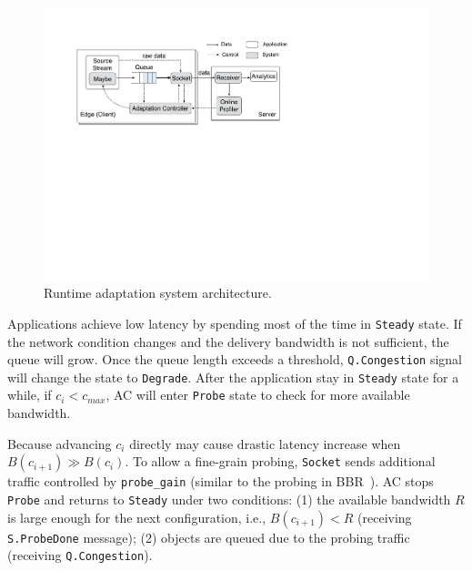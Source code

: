 \begin{figure}
  \centering
  \includegraphics[width=\linewidth]{figures/runtime-adaptation.pdf}
  \caption{Runtime adaptation system architecture.}
  \label{fig:runtime}
\end{figure}

 Applications achieve low latency by
spending most of the time in \texttt{Steady} state. If the network condition
changes and the delivery bandwidth is not sufficient, the queue will grow. Once
the queue length exceeds a threshold, \texttt{Q.Congestion} signal will change
the state to \texttt{Degrade}. After the application stay in \texttt{Steady}
state for a while, if $c_i < c_{max}$, AC will enter \texttt{Probe} state to
check for more available bandwidth.

 Because advancing $c_i$
directly may cause drastic latency increase when $B(c_{i+1}) \gg B(c_i)$. To
allow a fine-grain probing, \texttt{Socket} sends additional traffic controlled
by \texttt{probe\_gain} (similar to the probing in BBR~\cite{cardwell2017bbr}).
AC stops \texttt{Probe} and returns to \texttt{Steady} under two conditions: (1)
the available bandwidth $R$ is large enough for the next configuration, i.e.,
$B(c_{i+1}) < R$ (receiving \texttt{S.ProbeDone} message); (2) objects are
queued due to the probing traffic (receiving \texttt{Q.Congestion}).

